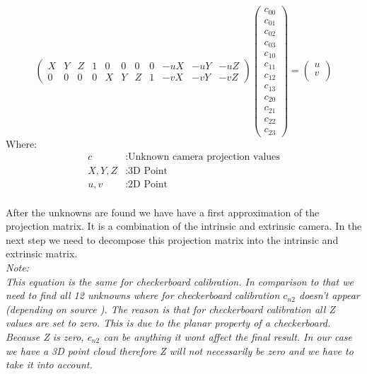 \documentclass[11pt,a4paper,titlepage,oneside]{report}
\begin{document}
\setcounter{MaxMatrixCols}{15}
\begin{equation}\label{eq:projection_flat}
	\begin{pmatrix}
		X & Y & Z & 1 & 0 & 0 & 0 & 0 & -uX & -uY & -uZ\\
		0 & 0 & 0 & 0 & X & Y & Z & 1 & -vX & -vY & -vZ
	\end{pmatrix}
	\begin{pmatrix}c_{00}\\
		c_{01}\\
		c_{02}\\
		c_{03}\\
		c_{10}\\
		c_{11}\\
		c_{12}\\
		c_{13}\\
		c_{20}\\
		c_{21}\\
		c_{22}\\
		c_{23}
	\end{pmatrix}=
	\begin{pmatrix}u\\
		v\\
	\end{pmatrix}
\end{equation}
Where:
\begin{align*}
  c					&: \text{Unknown camera projection values}\\
	X,Y,Z			&: \text{3D Point}\\
	u,v				&: \text{2D Point}\\
\end{align*}

After the unknowns are found we have have a first approximation of the projection matrix. It is a combination of the intrinsic and extrinsic camera. In the next step we need to decompose this projection matrix into the intrinsic and extrinsic matrix.\\
\em
Note:\\
This equation is the same for checkerboard calibration. In comparison to that we need to find all 12 unknowns where for checkerboard calibration $c_{n2}$ doesn't appear (depending on source \cite{Zhang}). The reason is that for checkerboard calibration all Z values are set to zero. This is due to the planar property of a checkerboard. Because Z is zero, $c_{n2}$ can be anything it wont affect the final result. In our case we have a 3D point cloud therefore Z will not necessarily be zero and we have to take it into account.
\normalfont
\end{document}
